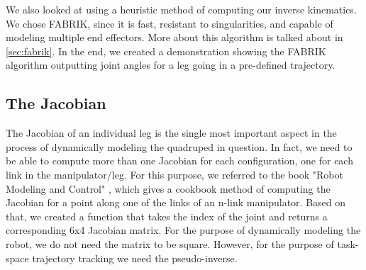 We also looked at using a heuristic method of computing our inverse kinematics. We chose FABRIK, since it is fast, resistant to singularities, and capable of modeling multiple end effectors. More about this algorithm is talked about in \ref{sec:fabrik}. In the end, we created a demonstration showing the FABRIK algorithm outputting joint angles for a leg going in a pre-defined trajectory. 

\subsection{The Jacobian}
The Jacobian of an individual leg is the single most important aspect in the process of dynamically modeling the quadruped in question. In fact, we need to be able to compute more than one Jacobian for each configuration, one for each link in the manipulator/leg.
For this purpose, we referred to the book "Robot Modeling and Control" \cite{spong2006robot}, which gives a cookbook method of computing the Jacobian for a point along one of the links of an n-link manipulator. Based on that, we created a function that takes the index of the joint and returns a corresponding 6x4 Jacobian matrix. For the purpose of dynamically modeling the robot, we do not need the matrix to be square. However, for the purpose of task-space trajectory tracking we need the pseudo-inverse.

